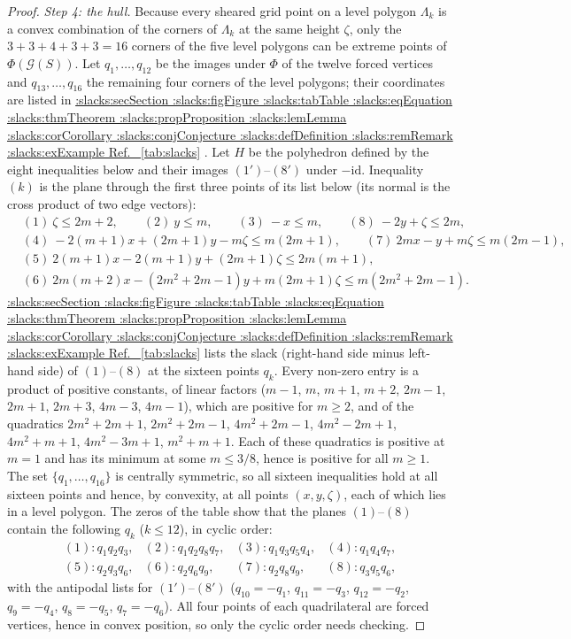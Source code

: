 \documentclass[11pt,a4paper]{article}
\makeatletter
\def\Cref@getprefix#1:#2\relax{#1}
\def\Cref@prefix@sec{sec}
\def\Cref@prefix@fig{fig}
\def\Cref@prefix@tab{tab}
\def\Cref@prefix@eq{eq}
\def\Cref@prefix@thm{thm}
\def\Cref@prefix@prop{prop}
\def\Cref@prefix@lem{lem}
\def\Cref@prefix@cor{cor}
\def\Cref@prefix@conj{conj}
\def\Cref@prefix@def{def}
\def\Cref@prefix@rem{rem}
\def\Cref@prefix@ex{ex}
\def\Cref@type@cap#1{%
  \edef\Cref@tmp{#1}%
  \ifx\Cref@tmp\Cref@prefix@sec Section%
  \else\ifx\Cref@tmp\Cref@prefix@fig Figure%
  \else\ifx\Cref@tmp\Cref@prefix@tab Table%
  \else\ifx\Cref@tmp\Cref@prefix@eq Equation%
  \else\ifx\Cref@tmp\Cref@prefix@thm Theorem%
  \else\ifx\Cref@tmp\Cref@prefix@prop Proposition%
  \else\ifx\Cref@tmp\Cref@prefix@lem Lemma%
  \else\ifx\Cref@tmp\Cref@prefix@cor Corollary%
  \else\ifx\Cref@tmp\Cref@prefix@conj Conjecture%
  \else\ifx\Cref@tmp\Cref@prefix@def Definition%
  \else\ifx\Cref@tmp\Cref@prefix@rem Remark%
  \else\ifx\Cref@tmp\Cref@prefix@ex Example%
  \else Ref.%
  \fi\fi\fi\fi\fi\fi\fi\fi\fi\fi\fi\fi
}
\DeclareRobustCommand{\Cref}[1]{%
  \begingroup
  \edef\Cref@label{#1}%
  \edef\Cref@prefix{\expandafter\Cref@getprefix\Cref@label:\relax}%
  \hyperref[#1]{\Cref@type@cap{\Cref@prefix}~\ref*{#1}}%
  \endgroup
}
\theoremstyle{plain}
\theoremstyle{definition}
\theoremstyle{remark}
\makeatother
\begin{document}
\begin{proof}
\emph{Step 4: the hull.}
Because every sheared grid point on a level polygon $\Lambda_k$ is a convex combination of the corners of $\Lambda_k$ at the same height $\zeta$, only the $3+3+4+3+3=16$ corners of the five level polygons can be extreme points of $\Phi(\mathcal G(S))$.
Let $q_1,\dots,q_{12}$ be the images under $\Phi$ of the twelve forced vertices and $q_{13},\dots,q_{16}$ the remaining four corners of the level polygons; their coordinates are listed in \Cref{tab:slacks}.
Let $H$ be the polyhedron defined by the eight inequalities below and their images $(1')$--$(8')$ under $-\mathrm{id}$.
Inequality $(k)$ is the plane through the first three points of its list below (its normal is the cross product of two edge vectors):
\begin{align*}
&(1)\ \zeta\le 2m+2, \qquad (2)\ y\le m, \qquad (3)\ -x\le m, \qquad (8)\ -2y+\zeta\le 2m,\\
&(4)\ -2(m{+}1)x+(2m{+}1)y-m\zeta\le m(2m{+}1),\qquad (7)\ 2mx-y+m\zeta\le m(2m{-}1),\\
&(5)\ 2(m{+}1)x-2(m{+}1)y+(2m{+}1)\zeta\le 2m(m{+}1),\\
&(6)\ 2m(m{+}2)x-(2m^2{+}2m{-}1)y+m(2m{+}1)\zeta\le m(2m^2{+}2m{-}1).
\end{align*}
\Cref{tab:slacks} lists the slack (right-hand side minus left-hand side) of $(1)$--$(8)$ at the sixteen points $q_k$.
Every non-zero entry is a product of positive constants, of linear factors ($m-1$, $m$, $m+1$, $m+2$, $2m-1$, $2m+1$, $2m+3$, $4m-3$, $4m-1$), which are positive for $m\ge2$, and of the quadratics $2m^2+2m+1$, $2m^2+2m-1$, $4m^2+2m-1$, $4m^2-2m+1$, $4m^2+m+1$, $4m^2-3m+1$, $m^2+m+1$.
Each of these quadratics is positive at $m=1$ and has its minimum at some $m\le3/8$, hence is positive for all $m\ge1$.
The set $\{q_1,\dots,q_{16}\}$ is centrally symmetric, so all sixteen inequalities hold at all sixteen points and hence, by convexity, at all points $(x,y,\zeta)$, each of which lies in a level polygon.
The zeros of the table show that the planes $(1)$--$(8)$ contain the following $q_k$ ($k\le12$), in cyclic order:
\[
\begin{array}{llll}
(1)\colon q_1q_2q_3, & (2)\colon q_1q_2q_8q_7, & (3)\colon q_1q_3q_5q_4, & (4)\colon q_1q_4q_7,\\
(5)\colon q_2q_3q_6, & (6)\colon q_2q_6q_9, & (7)\colon q_2q_8q_9, & (8)\colon q_3q_5q_6,
\end{array}
\]
with the antipodal lists for $(1')$--$(8')$ ($q_{10}=-q_1$, $q_{11}=-q_3$, $q_{12}=-q_2$, $q_9=-q_4$, $q_8=-q_5$, $q_7=-q_6$).
All four points of each quadrilateral are forced vertices, hence in convex position, so only the cyclic order needs checking.

\end{proof}
\end{document}
